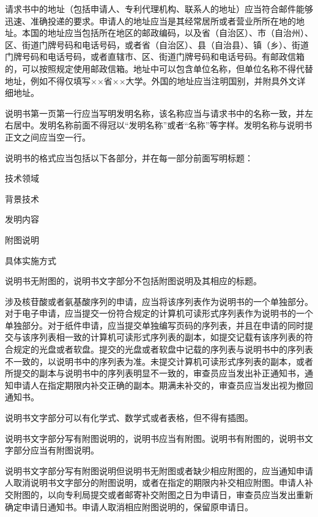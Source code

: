 请求书中的地址（包括申请人、专利代理机构、联系人的地址）应当符合邮件能够迅速、准确投递的要求。申请人的地址应当是其经常居所或者营业所所在地的地址。本国的地址应当包括所在地区的邮政编码，以及省（自治区）、市（自治州）、区、街道门牌号码和电话号码，或者省（自治区）、县（自治县）、镇（乡）、街道门牌号码和电话号码，或者直辖市、区、街道门牌号码和电话号码。有邮政信箱的，可以按照规定使用邮政信箱。地址中可以包含单位名称，但单位名称不得代替地址，例如不得仅填写××省××大学。外国的地址应当注明国别，并附具外文详细地址。

说明书第一页第一行应当写明发明名称，该名称应当与请求书中的名称一致，并左右居中。发明名称前面不得冠以“发明名称”或者“名称”等字样。发明名称与说明书正文之间应当空一行。

说明书的格式应当包括以下各部分，并在每一部分前面写明标题：

技术领域

背景技术

发明内容

附图说明

具体实施方式

说明书无附图的，说明书文字部分不包括附图说明及其相应的标题。

涉及核苷酸或者氨基酸序列的申请，应当将该序列表作为说明书的一个单独部分。对于电子申请，应当提交一份符合规定的计算机可读形式序列表作为说明书的一个单独部分。对于纸件申请，应当提交单独编写页码的序列表，并且在申请的同时提交与该序列表相一致的计算机可读形式序列表的副本，如提交记载有该序列表的符合规定的光盘或者软盘。提交的光盘或者软盘中记载的序列表与说明书中的序列表不一致的，以说明书中的序列表为准。未提交计算机可读形式序列表的副本，或者所提交的副本与说明书中的序列表明显不一致的，审查员应当发出补正通知书，通知申请人在指定期限内补交正确的副本。期满未补交的，审查员应当发出视为撤回通知书。

说明书文字部分可以有化学式、数学式或者表格，但不得有插图。

说明书文字部分写有附图说明的，说明书应当有附图。说明书有附图的，说明书文字部分应当有附图说明。

说明书文字部分写有附图说明但说明书无附图或者缺少相应附图的，应当通知申请人取消说明书文字部分的附图说明，或者在指定的期限内补交相应附图。申请人补交附图的，以向专利局提交或者邮寄补交附图之日为申请日，审查员应当发出重新确定申请日通知书。申请人取消相应附图说明的，保留原申请日。

